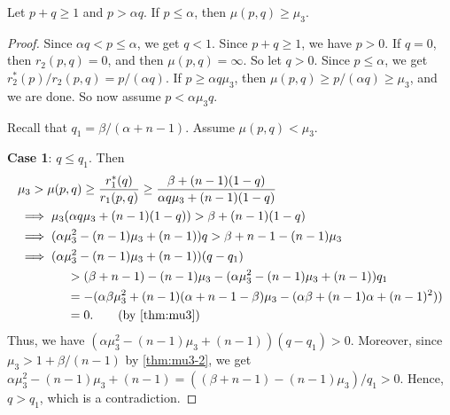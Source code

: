 \begin{lemma}
\label{thm:1.2}
Let $p + q \ge 1$ and $p > \alpha q$.
If $p \le \alpha$, then $\mu(p, q) \ge \mu_3$.
\end{lemma}
\begin{proof}
Since $\alpha q < p \le \alpha$, we get $q < 1$. Since $p + q \ge 1$, we have $p > 0$.
If $q = 0$, then $r_2(p, q) = 0$, and then $\mu(p, q) = \infty$. So let $q > 0$.
Since $p \le \alpha$, we get $r_2^*(p)/r_2(p, q) = p/(\alpha q)$.
If $p \ge \alpha q \mu_3$, then $\mu(p, q) \ge p/(\alpha q) \ge \mu_3$, and we are done.
So now assume $p < \alpha \mu_3 q$.

Recall that $q_1 = \beta/(\alpha+n-1)$. Assume $\mu(p, q) < \mu_3$.

\textbf{Case 1}: $q \le q_1$. Then
\begin{align*}
& \mu_3 > \mu(p, q) \ge \frac{r_1^*(q)}{r_1(p, q)} \ge \frac{\beta + (n-1)(1-q)}{\alpha q \mu_3 + (n-1)(1-q)}
\\ &\implies \mu_3(\alpha q \mu_3 + (n-1)(1-q)) > \beta + (n-1)(1-q)
\\ &\implies (\alpha\mu_3^2 - (n-1)\mu_3 + (n-1))q > \beta + n-1 - (n-1)\mu_3
\\ &\implies (\alpha\mu_3^2 - (n-1)\mu_3 + (n-1))(q - q_1)
    \\ &\qquad\qquad> (\beta + n-1) - (n-1)\mu_3 - (\alpha\mu_3^2 - (n-1)\mu_3 + (n-1))q_1
    \\ &\qquad\qquad= -(\alpha\beta\mu_3^2 + (n-1)(\alpha+n-1-\beta)\mu_3 - (\alpha\beta + (n-1)\alpha + (n-1)^2))
    \\ &\qquad\qquad= 0.
        \tag{by \cref{thm:mu3}}
\end{align*}
Thus, we have $(\alpha\mu_3^2 - (n-1)\mu_3 + (n-1))(q - q_1) > 0$.
Moreover, since $\mu_3 > 1 + \beta/(n-1)$ by \cref{thm:mu3-2}, we get
$\alpha\mu_3^2 - (n-1)\mu_3 + (n-1) = ((\beta + n-1) - (n-1)\mu_3)/q_1 > 0$.
Hence, $q > q_1$, which is a contradiction.


\end{proof}
